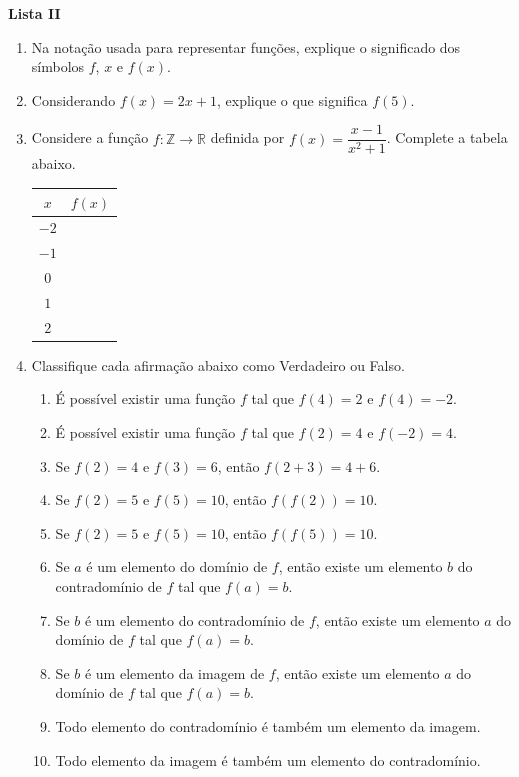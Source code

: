 \documentclass[12pt,a4paper]{article}
\begin{document}
\begin{center}
  \textbf{Lista II}
\end{center}

\begin{enumerate}
  \item Na notação usada para representar funções, explique o significado dos símbolos $f$, $x$ e $f(x)$.
  \item Considerando $f(x)=2x + 1$, explique o que significa $f(5)$.
  \item Considere a função $f:\mathbb{Z}\to\mathbb{R}$ definida por $f(x)=\dfrac{x - 1}{x^2 + 1}$. 
    Complete a tabela abaixo.

    \begin{table}[H]
      \centering
      \begin{tabular}{c|c}
          $x$ & $f(x)$ \\ \hline
          $-2$ &  \\ \hline
          $-1$ &  \\ \hline
          $0$ &  \\ \hline
          $1$ &  \\ \hline
          $2$ &
      \end{tabular}
    \end{table}
    
  \item Classifique cada afirmação abaixo como Verdadeiro ou Falso.
    \begin{enumerate}[(\ \ )]
      \item É possível existir uma função $f$ tal que $f(4) = 2$ e $f(4) = -2$.
      \item É possível existir uma função $f$ tal que $f(2) = 4$ e $f(-2) = 4$.
      \item Se $f(2) = 4$ e $f(3) = 6$, então $f(2 + 3) = 4 + 6$.
      \item Se $f(2) = 5$ e $f(5) = 10$, então $f(f(2)) = 10$.
      \item Se $f(2) = 5$ e $f(5) = 10$, então $f(f(5)) = 10$.
      \item Se $a$ é um elemento do domínio de $f$, então existe um elemento $b$
        do contradomínio de $f$ tal que $f(a) = b$.
      \item Se $b$ é um elemento do contradomínio de $f$, então existe um elemento $a$
        do domínio de $f$ tal que $f(a) = b$.
      \item Se $b$ é um elemento da imagem de $f$, então existe um elemento $a$
        do domínio de $f$ tal que $f(a) = b$.
      \item Todo elemento do contradomínio é também um elemento da imagem.
      \item Todo elemento da imagem é também um elemento do contradomínio.
    \end{enumerate}


\end{enumerate}
\end{document}
